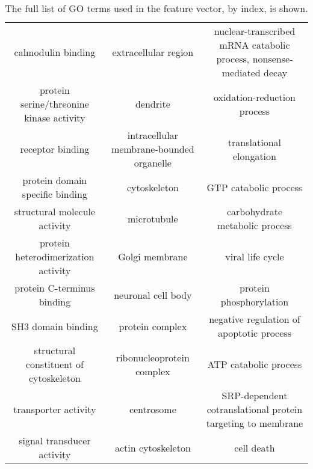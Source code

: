 \begin{table}
\begin{tabular}{c c c}
        calmodulin binding & extracellular region & nuclear-transcribed mRNA catabolic process, nonsense-mediated decay \\
        protein serine/threonine kinase activity & dendrite & oxidation-reduction process \\
        receptor binding & intracellular membrane-bounded organelle & translational elongation \\
        protein domain specific binding & cytoskeleton & GTP catabolic process \\
        structural molecule activity & microtubule & carbohydrate metabolic process \\
        protein heterodimerization activity & Golgi membrane & viral life cycle \\
        protein C-terminus binding & neuronal cell body & protein phosphorylation \\
        SH3 domain binding & protein complex & negative regulation of apoptotic process \\
        structural constituent of cytoskeleton & ribonucleoprotein complex & ATP catabolic process \\
        transporter activity & centrosome & SRP-dependent cotranslational protein targeting to membrane \\
        signal transducer activity & actin cytoskeleton & cell death \\
    \end{tabular}
    \caption{The full list of GO terms used in the feature vector, by index, is shown.}
    \label{apptab:extrago}
\end{table}
